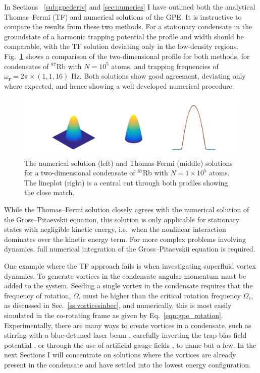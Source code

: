 In Sections ~\ref{sub:gpederiv} and \ref{sec:numerics} I have outlined both the analytical Thomas--Fermi (TF) and numerical solutions of the GPE. It is instructive to compare the results from these two methods. For a stationary condensate in the groundstate of a harmonic trapping potential the profile and width should be comparable, with the TF solution deviating only in the low-density regions. Fig.~\ref{fig:gpe_tf_3} shows a comparison of the two-dimensional profile for both methods, for condensates of $^{87}$Rb with $N=10^{5}$ atoms, and trapping frequencies of $\omega_{\mathbf{r}}=2\pi\times (1, 1, 16 )$ Hz. Both solutions show good agreement, deviating only where expected, and hence showing a well developed numerical procedure.
\begin{figure}\centering
    \includegraphics[width=\textwidth,trim=0ex 0ex 0ex 0ex]{Images/ch4_vtx/gpe_tf_3.pdf}
    \caption{The numerical solution (left) and Thomas-Fermi (middle) solutions for a two-dimensional condensate of $^{87}$Rb with $N=1\times 10^5$ atoms. The lineplot (right) is a central cut through both profiles showing the close match.}\label{fig:gpe_tf_3}
\end{figure}

While the Thomas--Fermi solution closely agrees with the numerical solution of the Gross--Pitaevskii equation, this solution is only applicable for stationary states with negligible kinetic energy, i.e.~when the nonlinear interaction dominates over the kinetic energy term. For more complex problems involving dynamics, full numerical integration of the Gross--Pitaevskii equation is required.

One example where the TF approach fails is when investigating superfluid vortex dynamics. To generate vortices in the condensate angular momentum must be added to the system. Seeding a single vortex in the condensate requires that the frequency of rotation, $\Omega$, must be higher than the critical rotation frequency $\Omega_c$, as discussed in Sec.~\ref{ss:vorticesinbec}, and numerically, this is most easily simulated in the co-rotating frame as given by Eq.~\eqref{eqn:gpe_rotation}. Experimentally, there are many ways to create vortices in a condensate, such as stirring with a blue-detuned laser beam \cite{Vtx:Raman_prl_2001}, carefully inverting the trap bias field potential \cite{VTX:Kawaguchi_pra_2004_2,VTX:Masuda_pra_2016}, or through the use of artificial gauge fields \cite{AO:Dalibard_rmp_2011}, to name but a few. In the next Sections I will concentrate on solutions where the vortices are already present in the condensate and have settled into the lowest energy configuration.


